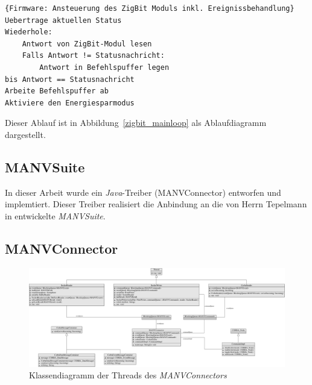 \begin{lstlisting}{Firmware: Ansteuerung des ZigBit Moduls inkl. Ereignissbehandlung}
Uebertrage aktuellen Status
Wiederhole:
    Antwort von ZigBit-Modul lesen
    Falls Antwort != Statusnachricht:
        Antwort in Befehlspuffer legen
bis Antwort == Statusnachricht    
Arbeite Befehlspuffer ab
Aktiviere den Energiesparmodus
\end{lstlisting}

Dieser Ablauf ist in Abbildung~\ref{zigbit_mainloop} als Ablaufdiagramm dargestellt.

\subsection{MANVSuite}

In dieser Arbeit wurde ein \emph{Java}-Treiber (MANVConnector) entworfen und implemtiert. Dieser Treiber realisiert die 
Anbindung an die von Herrn Tepelmann in \cite{Jan} entwickelte \emph{MANVSuite}. 


\subsection{MANVConnector}
\begin{figure}
        \includegraphics*[width=1\textwidth]{uml_diagramme/manvconnector_uml_threads.pdf}
        \caption{Klassendiagramm der Threads des \emph{MANVConnectors}}
        \label{klassendiagramm_manvconnector_threads}
\end{figure}




